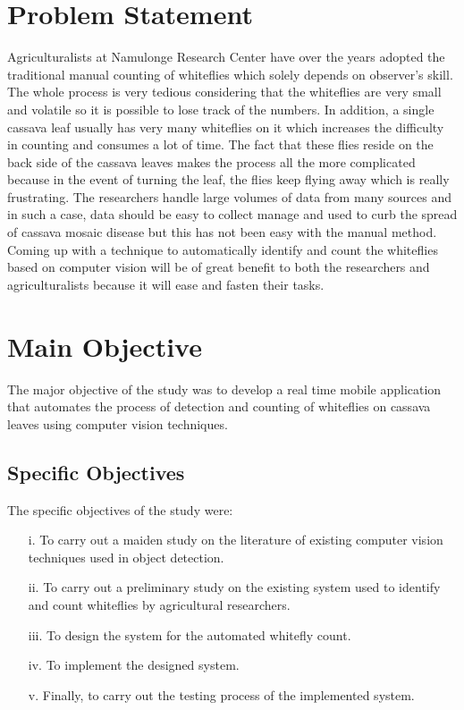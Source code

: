 \section{Problem Statement}
Agriculturalists at Namulonge Research Center have over the years adopted the traditional manual counting of whiteflies which solely depends on observer’s skill. The whole process is very tedious considering that the whiteflies are very small and volatile so it is possible to lose track of the numbers.  In addition, a single cassava leaf usually has very many whiteflies on it which increases the difficulty in counting and consumes a lot of time. The fact that these flies reside on the back side of the cassava leaves makes the process all the more complicated because in the event of turning the leaf, the flies keep flying away which is really frustrating. 
The researchers handle large volumes of data from many sources and in such a case, data should be easy to collect manage and used to curb the spread of cassava mosaic disease but this has not been easy with the manual method.
Coming up with a technique to automatically identify and count the whiteflies based on computer vision will be of great benefit to both the researchers and agriculturalists because it will ease and fasten their tasks.
\section{Main Objective}
The major objective of the study was to develop a real time mobile application that automates the process of detection and counting of whiteflies on cassava leaves using computer vision techniques. 
\subsection{Specific Objectives}
The specific objectives of the study were: 
\begin{itemize}
\item[i.] To carry out a maiden study on the literature of existing computer vision techniques used in object detection.
\item[ii.] To carry out a preliminary study on the existing system used to identify and count whiteflies by agricultural researchers.
\item[iii.] To design the system for the automated whitefly count.
\item[iv.] To implement the designed system.
\item[v.] Finally, to carry out the testing process of the implemented system.
\end{itemize}


